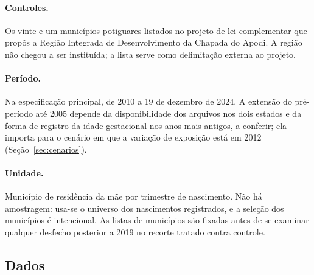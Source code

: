 \paragraph{Controles.} Os vinte e um municípios potiguares listados no projeto
de lei complementar que propôs a Região Integrada de Desenvolvimento da Chapada
do Apodi. A região não chegou a ser instituída; a lista serve como delimitação
externa ao projeto.

\paragraph{Período.} Na especificação principal, de 2010 a 19 de dezembro de
2024. A extensão do pré-período até 2005 depende da disponibilidade dos
arquivos nos dois estados e da forma de registro da idade gestacional nos anos
mais antigos, a conferir; ela importa para o cenário em que a variação de
exposição está em 2012 (Seção~\ref{sec:cenarios}).

\paragraph{Unidade.} Município de residência da mãe por trimestre de nascimento.
Não há amostragem: usa-se o universo dos nascimentos registrados, e a seleção
dos municípios é intencional. As listas de municípios são fixadas antes de se
examinar qualquer desfecho posterior a 2019 no recorte tratado contra
controle.

\subsection{Dados}

